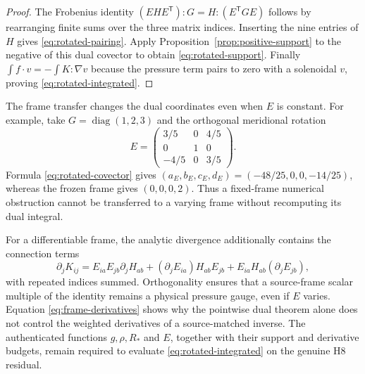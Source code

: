 \documentclass[11pt,a4paper]{article}
\theoremstyle{plain}
\theoremstyle{definition}
\begin{document}
\begin{proof}
The Frobenius identity
$(EHE^{\mathsf T}):G=H:(E^{\mathsf T}GE)$ follows by
rearranging finite sums over the three matrix indices. Inserting
the nine entries of $H$ gives \eqref{eq:rotated-pairing}.
Apply Proposition~\ref{prop:positive-support} to the negative
of this dual covector to obtain \eqref{eq:rotated-support}.
Finally $\int f\cdot v=-\int K:\nabla v$ because the pressure
term pairs to zero with a solenoidal $v$, proving
\eqref{eq:rotated-integrated}.
\end{proof}

The frame transfer changes the dual coordinates even when
$E$ is constant. For example, take $G=\operatorname{diag}(1,2,3)$
and the orthogonal meridional rotation
\[
 E=\begin{pmatrix}3/5&0&4/5\\0&1&0\\-4/5&0&3/5\end{pmatrix}.
\]
Formula \eqref{eq:rotated-covector} gives
$(a_E,b_E,c_E,d_E)=(-48/25,0,0,-14/25)$,
whereas the frozen frame gives $(0,0,0,2)$. Thus a fixed-frame
numerical obstruction cannot be transferred to a varying frame
without recomputing its dual integral.

For a differentiable frame, the analytic divergence additionally
contains the connection terms
\begin{equation}\label{eq:frame-derivatives}
 \partial_jK_{ij}=
 E_{ia}E_{jb}\partial_jH_{ab}
 +(\partial_jE_{ia})H_{ab}E_{jb}
 +E_{ia}H_{ab}(\partial_jE_{jb}),
\end{equation}
with repeated indices summed. Orthogonality ensures that a source-frame
scalar multiple of the identity remains a physical pressure gauge,
even if $E$ varies. Equation \eqref{eq:frame-derivatives} shows why
the pointwise dual theorem alone does not control the weighted
derivatives of a source-matched inverse. The authenticated functions
$g,\rho,R_*$ and $E$, together with their support and derivative
budgets, remain required to evaluate \eqref{eq:rotated-integrated}
on the genuine H8 residual.
\end{document}
